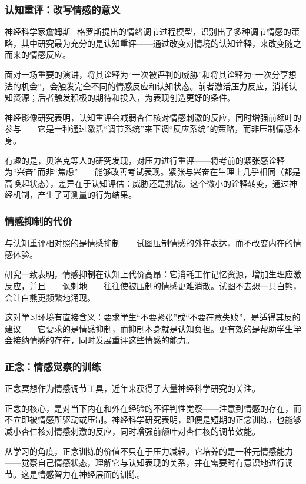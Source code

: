 \documentclass[11pt]{article}
\begin{document}
\subsubsection{认知重评：改写情感的意义}
\label{sec:org4108b85}

神经科学家詹姆斯·格罗斯提出的情绪调节过程模型，识别出了多种调节情感的策略，其中研究最为充分的是认知重评——通过改变对情境的认知诠释，来改变随之而来的情感反应。

面对一场重要的演讲，将其诠释为“一次被评判的威胁”和将其诠释为“一次分享想法的机会”，会触发完全不同的情感反应和认知状态。前者激活压力反应，消耗认知资源；后者触发积极的期待和投入，为表现创造更好的条件。

神经影像研究表明，认知重评会减弱杏仁核对情感刺激的反应，同时增强前额叶的参与——它是一种通过激活“调节系统”来下调“反应系统”的策略，而非压制情感本身。

有趣的是，贝洛克等人的研究发现，对压力进行重评——将考前的紧张感诠释为“兴奋”而非“焦虑”——能够改善考试表现。紧张与兴奋在生理上几乎相同（都是高唤起状态），差异在于认知评估：威胁还是挑战。这个微小的诠释转变，通过神经机制，产生了可测量的行为结果。
\subsubsection{情感抑制的代价}
\label{sec:orgb104c11}

与认知重评相对照的是情感抑制——试图压制情感的外在表达，而不改变内在的情感体验。

研究一致表明，情感抑制在认知上代价高昂：它消耗工作记忆资源，增加生理应激反应，并且——讽刺地——往往使被压制的情感更难消散。试图不去想一只白熊，会让白熊更频繁地涌现。

这对学习环境有直接含义：要求学生“不要紧张”或“不要在意失败”，是适得其反的建议——它要求的是情感抑制，而抑制本身就是认知负担。更有效的是帮助学生学会接纳情感的存在，同时发展重评这些情感的能力。
\subsubsection{正念：情感觉察的训练}
\label{sec:org0814bd0}

正念冥想作为情感调节工具，近年来获得了大量神经科学研究的关注。

正念的核心，是对当下内在和外在经验的不评判性觉察——注意到情感的存在，而不立即被情感所驱动或压制。神经科学研究表明，即便是短期的正念训练，也能够减小杏仁核对情感刺激的反应，同时增强前额叶对杏仁核的调节效能。

从学习的角度，正念训练的价值不只在于压力减轻。它培养的是一种元情感能力——觉察自己情感状态，理解它与认知表现的关系，并在需要时有意识地进行调节。这是情感智力在神经层面的训练。
\end{document}
